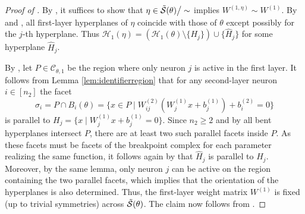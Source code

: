 \documentclass{article}
\theoremstyle{definition}
\newcommand{\weights}[1]{W^{(#1)}}
\newcommand{\bias}[1]{b^{(#1)}}
\newcommand{\complex}{\mathcal{C}}
\newcommand{\hyperplanes}[2]{\mathcal{H}_{#1}(#2)}
\newcommand{\gfiber}[1]{\Tilde{\mathcal{S}}({#1})}
\newcommand{\modulo}[1]{\big/#1}
\begin{document}
 
\fiberfromhiding*

\begin{proof}[Proof of ] 
 By , it suffices to show that $\eta \in \gfiber{\theta} \modulo{\sim}$ implies $\weights{1,\eta} \sim \weights{1}$. 
 By  and , all first-layer hyperplanes of $\eta$ coincide with those of $\theta$ except possibly for 
the $j$-th hyperplane. Thus 
\(
\hyperplanes{1}{\eta}
=
(\hyperplanes{1}{\theta} \setminus \{H_j\}) \cup \{\widehat H_j\}
\)
for some hyperplane $\widehat H_j$. 

By , let $P \in \complex_{\theta,1}$ be the region where only neuron $j$ is active in the first layer. 
It follows from Lemma \ref{lem:identifierregion} that
for any second-layer neuron $i\in[n_2]$
the facet  
\[
\sigma_i
=
P \cap B_i(\theta)
=
\{ x \in P \mid \weights{2}_{i j}(\weights{1}_j x + \bias{1}_j) + \bias{2}_i = 0 \}
\]
is  parallel to $H_j=\{x\mid \weights{1}_j x + \bias{1}_j = 0\}$. 
Since $n_2 \ge 2$ and by  all bent hyperplanes intersect $P$, there are at least two such parallel facets inside $P$. 
As these facets must be facets of the breakpoint complex for each parameter realizing the same function,
it follows again by  that $\widehat H_j$ is parallel to $H_j$. 
%
Moreover, by the same lemma, only neuron $j$ can be active on the region containing the two parallel facets, which implies that the orientation of the hyperplanes is also determined.  
Thus, the first-layer weight matrix $\weights{1}$ is fixed (up to trivial symmetries) across $\gfiber{\theta}$. 
The claim now follows from . 
\end{proof}

\fiberfromhidingsingleneuron*
\end{document}

